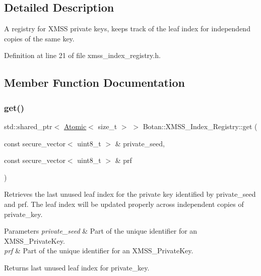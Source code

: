 \subsection{Detailed Description}
A registry for X\+M\+SS private keys, keeps track of the leaf index for independend copies of the same key. 

Definition at line 21 of file xmss\+\_\+index\+\_\+registry.\+h.



\subsection{Member Function Documentation}
\mbox{\label{class_botan_1_1_x_m_s_s___index___registry_a10f269ceb92c6fa9c0916708c399d6c2}} 
\subsubsection{\texorpdfstring{get()}{get()}}
{\footnotesize\ttfamily std\+::shared\+\_\+ptr$<$ \mbox{\hyperlink{class_botan_1_1_atomic}{Atomic}}$<$ size\+\_\+t $>$ $>$ Botan\+::\+X\+M\+S\+S\+\_\+\+Index\+\_\+\+Registry\+::get (\begin{DoxyParamCaption}\item[{const secure\+\_\+vector$<$ uint8\+\_\+t $>$ \&}]{private\+\_\+seed,  }\item[{const secure\+\_\+vector$<$ uint8\+\_\+t $>$ \&}]{prf }\end{DoxyParamCaption})}

Retrieves the last unused leaf index for the private key identified by private\+\_\+seed and prf. The leaf index will be updated properly across independent copies of private\+\_\+key.


\begin{DoxyParams}{Parameters}
{\em private\+\_\+seed} & Part of the unique identifier for an X\+M\+S\+S\+\_\+\+Private\+Key. \\
\hline
{\em prf} & Part of the unique identifier for an X\+M\+S\+S\+\_\+\+Private\+Key.\\
\hline
\end{DoxyParams}
\begin{DoxyReturn}{Returns}
last unused leaf index for private\+\_\+key. 
\end{DoxyReturn}


